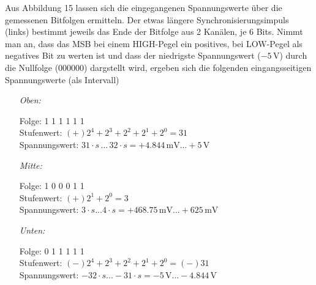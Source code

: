 \documentclass[a4paper, 12pt]{article}
\begin{document}
Aus Abbildung 15 lassen sich die eingegangenen Spannungswerte über die
gemessenen Bitfolgen
ermitteln. Der etwas längere Synchronisierungsimpuls (links) bestimmt jeweils das Ende
der Bitfolge aus 2 Kanälen, je $6$ Bits.
Nimmt man an, dass das MSB bei einem HIGH-Pegel ein positives, bei LOW-Pegel als
negatives Bit zu werten ist und dass der niedrigste Spannungswert
($-5\,\si{\volt}$) durch die Nullfolge (000000) dargstellt wird, ergeben sich
die folgenden eingangsseitigen Spannungswerte (als Intervall)

\begin{enumerate}
  \item[\textit{Oben:}]
    \begin{enumerate}
      Folge: 1 1 1 1 1 1\\
      Stufenwert: $(+)2^4+2^3+2^2+2^1+2^0=31$\\
      Spannungswert:  $31 \cdot s \, ... \, 32 \cdot s= +4.844 \,\si{\milli\volt}
      ... +5\,\si{\volt}$ 
    \end{enumerate}

  \item[\textit{Mitte:}]
    \begin{enumerate}
      Folge: 1 0 0 0 1 1\\
      Stufenwert: $(+)2^1+2^0 = 3$\\
      Spannungswert: $ 3 \cdot s ... 4 \cdot s = +468.75\,\si{\milli\volt}...+625\,\si{\milli\volt}$
    \end{enumerate}

  \item[\textit{Unten:}]
    \begin{enumerate}
      Folge: 0 1 1 1 1 1\\
      Stufenwert: $(-) 2^4+2^3+2^2+2^1+2^0 = (-)31$\\
      Spannungswert: $-32\cdot s ... -31 \cdot s = -5 \,\si{\volt}...-4.844 \, \si{\volt}$
    \end{enumerate}

\end{enumerate}
\end{document}

